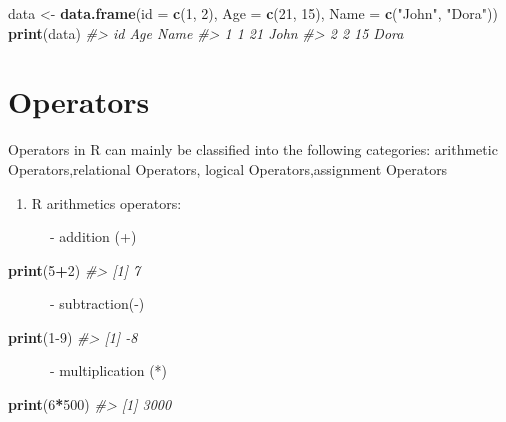 \documentclass[
]{book}
\newenvironment{Shaded}{\begin{snugshade}}{\end{snugshade}}
\newcommand{\AttributeTok}[1]{\textcolor[rgb]{0.13,0.29,0.53}{#1}}
\newcommand{\CommentTok}[1]{\textcolor[rgb]{0.56,0.35,0.01}{\textit{#1}}}
\newcommand{\DecValTok}[1]{\textcolor[rgb]{0.00,0.00,0.81}{#1}}
\newcommand{\FunctionTok}[1]{\textcolor[rgb]{0.13,0.29,0.53}{\textbf{#1}}}
\newcommand{\NormalTok}[1]{#1}
\newcommand{\OtherTok}[1]{\textcolor[rgb]{0.56,0.35,0.01}{#1}}
\newcommand{\SpecialCharTok}[1]{\textcolor[rgb]{0.81,0.36,0.00}{\textbf{#1}}}
\newcommand{\StringTok}[1]{\textcolor[rgb]{0.31,0.60,0.02}{#1}}
\providecommand{\tightlist}{%
  \setlength{\itemsep}{0pt}\setlength{\parskip}{0pt}}
\begin{document}
\begin{Shaded}
\begin{Highlighting}[]
\NormalTok{data }\OtherTok{\textless{}{-}} \FunctionTok{data.frame}\NormalTok{(}\AttributeTok{id =} \FunctionTok{c}\NormalTok{(}\DecValTok{1}\NormalTok{, }\DecValTok{2}\NormalTok{), }\AttributeTok{Age =} \FunctionTok{c}\NormalTok{(}\DecValTok{21}\NormalTok{, }\DecValTok{15}\NormalTok{), }\AttributeTok{Name =} \FunctionTok{c}\NormalTok{(}\StringTok{"John"}\NormalTok{, }\StringTok{"Dora"}\NormalTok{))}
\FunctionTok{print}\NormalTok{(data)}
\CommentTok{\#\textgreater{}   id Age Name}
\CommentTok{\#\textgreater{} 1  1  21 John}
\CommentTok{\#\textgreater{} 2  2  15 Dora}
\end{Highlighting}
\end{Shaded}

\hypertarget{operators}{%
\section{Operators}\label{operators}}

Operators in R can mainly be classified into the following categories: arithmetic Operators,relational Operators, logical Operators,assignment Operators

\begin{enumerate}
\def\labelenumi{\arabic{enumi}.}
\tightlist
\item
  R arithmetics operators:
\end{enumerate}

~~~~~~- addition (+)

\begin{Shaded}
\begin{Highlighting}[]
\FunctionTok{print}\NormalTok{(}\DecValTok{5}\SpecialCharTok{+}\DecValTok{2}\NormalTok{)}
\CommentTok{\#\textgreater{} [1] 7}
\end{Highlighting}
\end{Shaded}

~~~~~~- subtraction(-)

\begin{Shaded}
\begin{Highlighting}[]
\FunctionTok{print}\NormalTok{(}\DecValTok{1{-}9}\NormalTok{)}
\CommentTok{\#\textgreater{} [1] {-}8}
\end{Highlighting}
\end{Shaded}

~~~~~~- multiplication (*)

\begin{Shaded}
\begin{Highlighting}[]
\FunctionTok{print}\NormalTok{(}\DecValTok{6}\SpecialCharTok{*}\DecValTok{500}\NormalTok{)}
\CommentTok{\#\textgreater{} [1] 3000}
\end{Highlighting}
\end{Shaded}
\end{document}
